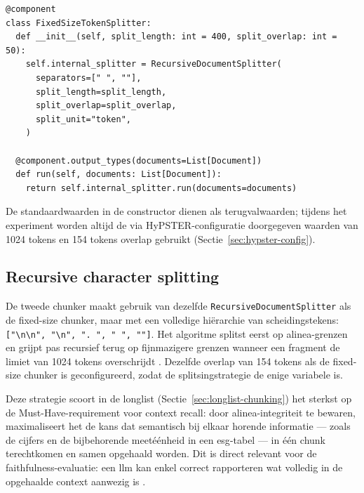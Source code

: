 \begin{listing}[H]
\begin{verbatim}
@component
class FixedSizeTokenSplitter:
  def __init__(self, split_length: int = 400, split_overlap: int = 50):
    self.internal_splitter = RecursiveDocumentSplitter(
      separators=[" ", ""],
      split_length=split_length,
      split_overlap=split_overlap,
      split_unit="token",
    )

  @component.output_types(documents=List[Document])
  def run(self, documents: List[Document]):
    return self.internal_splitter.run(documents=documents)
\end{verbatim}
\caption[FixedSizeTokenSplitter: fixed-size chunking als deterministisch referentiepunt]{De fixed-size chunker splitst uitsluitend op woordgrenzen in een venster van 1024 tokens (overlap 154). Door \texttt{[" ", ""]} als separatoren te gebruiken binnen de \texttt{RecursiveDocumentSplitter}, is de vergelijking met de recursieve chunker volledig gecontroleerd: het enige verschil is de hiërarchie van scheidingstekens.}
\end{listing}

De standaardwaarden in de constructor dienen als terugvalwaarden; tijdens het experiment worden altijd de via HyPSTER-configuratie doorgegeven waarden van 1024 tokens en 154 tokens overlap gebruikt (Sectie~\ref{sec:hypster-config}).

\subsection{Recursive character splitting}
\label{subsec:recursive-chunker}

De tweede chunker maakt gebruik van dezelfde \texttt{RecursiveDocumentSplitter} als de fixed-size chunker, maar met een volledige hiërarchie van scheidingstekens: \texttt{["\textbackslash n\textbackslash n", "\textbackslash n", ". ", " ", ""]}. Het algoritme splitst eerst op alinea-grenzen en grijpt pas recursief terug op fijnmazigere grenzen wanneer een fragment de limiet van 1024 tokens overschrijdt \autocite{LangChain2024}. Dezelfde overlap van 154 tokens als de fixed-size chunker is geconfigureerd, zodat de splitsingstrategie de enige variabele is.

Deze strategie scoort in de longlist (Sectie~\ref{sec:longlist-chunking}) het sterkst op de Must-Have-requirement voor context recall: door alinea-integriteit te bewaren, maximaliseert het de kans dat semantisch bij elkaar horende informatie — zoals de cijfers en de bijbehorende meetéénheid in een \gls{esg}-tabel — in één chunk terechtkomen en samen opgehaald worden. Dit is direct relevant voor de faithfulness-evaluatie: een \gls{llm} kan enkel correct rapporteren wat volledig in de opgehaalde context aanwezig is \autocite{Es2024}.

